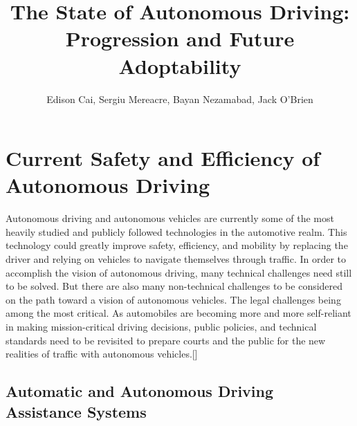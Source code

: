 \documentclass{article}
\author{Edison Cai, Sergiu Mereacre, Bayan Nezamabad, Jack O'Brien}
\title{The State of Autonomous Driving: Progression and Future Adoptability}
\begin{document}
\maketitle

\section{Current Safety and Efficiency of Autonomous Driving}

Autonomous driving and autonomous vehicles are currently some of the most heavily studied and publicly followed technologies in the automotive realm. This technology could greatly improve safety, efficiency, and mobility by replacing the driver and relying on vehicles to navigate themselves through traffic. In order to accomplish the vision of autonomous driving, many technical challenges need still to be solved. But there are also many non-technical challenges to be considered on the path toward a vision of autonomous vehicles. The legal challenges being among the most critical. As automobiles are becoming more and more self-reliant in making mission-critical driving decisions, public policies, and technical standards need to be revisited to prepare courts and the public for the new realities of traffic with autonomous vehicles.[\textcite{beiker2012legal}]

\subsection{Automatic and Autonomous Driving Assistance Systems}
\end{document}
